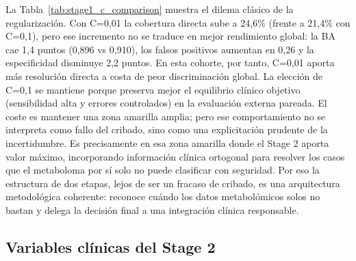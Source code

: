 \begin{table}[ht]
\centering
\caption{Comparación de rendimiento del sistema cascada bajo diferentes regularizaciones del Stage 1.}
\label{tab:stage1_c_comparison}
\small
\setlength{\tabcolsep}{4pt}
\end{table}

La Tabla~\ref{tab:stage1_c_comparison} muestra el dilema clásico de la regularización. Con C=0,01 la cobertura directa sube a 24,6\% (frente a 21,4\% con C=0,1), pero ese incremento no se traduce en mejor rendimiento global: la BA cae 1,4 puntos (0,896 vs 0,910), los falsos positivos aumentan en 0,26 y la especificidad disminuye 2,2 puntos. En esta cohorte, por tanto, C=0,01 aporta más resolución directa a costa de peor discriminación global. La elección de C=0,1 se mantiene porque preserva mejor el equilibrio clínico objetivo (sensibilidad alta y errores controlados) en la evaluación externa pareada. El coste es mantener una zona amarilla amplia; pero ese comportamiento no se interpreta como fallo del cribado, sino como una explicitación prudente de la incertidumbre. Es precisamente en esa zona amarilla donde el Stage 2 aporta valor máximo, incorporando información clínica ortogonal para resolver los casos que el metaboloma por sí solo no puede clasificar con seguridad. Por eso la estructura de dos etapas, lejos de ser un fracaso de cribado, es una arquitectura metodológica coherente: reconoce cuándo los datos metabolómicos solos no bastan y delega la decisión final a una integración clínica responsable.

\subsection{Variables clínicas del Stage 2}

